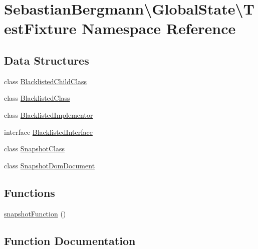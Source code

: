 \hypertarget{namespace_sebastian_bergmann_1_1_global_state_1_1_test_fixture}{}\section{Sebastian\+Bergmann\textbackslash{}Global\+State\textbackslash{}Test\+Fixture Namespace Reference}
\label{namespace_sebastian_bergmann_1_1_global_state_1_1_test_fixture}
\subsection*{Data Structures}
\begin{DoxyCompactItemize}
\item 
class \mbox{\hyperlink{class_sebastian_bergmann_1_1_global_state_1_1_test_fixture_1_1_blacklisted_child_class}{Blacklisted\+Child\+Class}}
\item 
class \mbox{\hyperlink{class_sebastian_bergmann_1_1_global_state_1_1_test_fixture_1_1_blacklisted_class}{Blacklisted\+Class}}
\item 
class \mbox{\hyperlink{class_sebastian_bergmann_1_1_global_state_1_1_test_fixture_1_1_blacklisted_implementor}{Blacklisted\+Implementor}}
\item 
interface \mbox{\hyperlink{interface_sebastian_bergmann_1_1_global_state_1_1_test_fixture_1_1_blacklisted_interface}{Blacklisted\+Interface}}
\item 
class \mbox{\hyperlink{class_sebastian_bergmann_1_1_global_state_1_1_test_fixture_1_1_snapshot_class}{Snapshot\+Class}}
\item 
class \mbox{\hyperlink{class_sebastian_bergmann_1_1_global_state_1_1_test_fixture_1_1_snapshot_dom_document}{Snapshot\+Dom\+Document}}
\end{DoxyCompactItemize}
\subsection*{Functions}
\begin{DoxyCompactItemize}
\item 
\mbox{\hyperlink{namespace_sebastian_bergmann_1_1_global_state_1_1_test_fixture_aa9a1e3ca77bd927a1daf63ba6ab56fdf}{snapshot\+Function}} ()
\end{DoxyCompactItemize}


\subsection{Function Documentation}
\mbox{\label{namespace_sebastian_bergmann_1_1_global_state_1_1_test_fixture_aa9a1e3ca77bd927a1daf63ba6ab56fdf}} 
